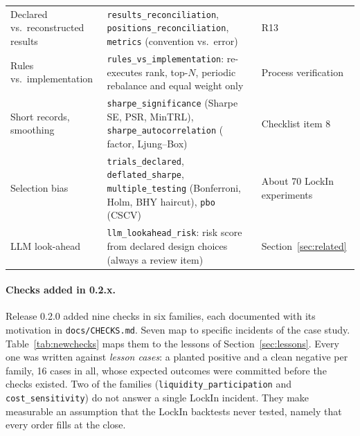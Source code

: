 \documentclass[11pt]{article}
\begin{document}
\begin{table}[t]
\begin{tabularx}{\textwidth}{>{\raggedright\arraybackslash}p{3.3cm}>{\raggedright\arraybackslash}X>{\raggedright\arraybackslash}p{3.7cm}}
Declared vs.\ reconstructed results & \texttt{results\_reconciliation}, \texttt{positions\_reconciliation}, \texttt{metrics} (convention vs.\ error) & R13 \\
Rules vs.\ implementation & \texttt{rules\_vs\_implementation}: re-executes rank, top-$N$, periodic rebalance and equal weight only & Process verification \\
Short records, smoothing & \texttt{sharpe\_significance} (Sharpe SE, PSR, MinTRL), \texttt{sharpe\_autocorrelation} (\citealt{Lo2002} factor, Ljung--Box) & Checklist item 8 \\
Selection bias & \texttt{trials\_declared}, \texttt{deflated\_sharpe}, \texttt{multiple\_testing} (Bonferroni, Holm, BHY haircut), \texttt{pbo} (CSCV) & About 70 LockIn experiments \\
LLM look-ahead & \texttt{llm\_lookahead\_risk}: risk score from declared design choices (always a review item) & Section~\ref{sec:related} \\
\bottomrule
\end{tabularx}
\end{table}

\paragraph{Checks added in 0.2.x.} Release 0.2.0 added nine checks in six families, each documented with its motivation in \texttt{docs/CHECKS.md}. Seven map to specific incidents of the case study. Table~\ref{tab:newchecks} maps them to the lessons of Section~\ref{sec:lessons}. Every one was written against \emph{lesson cases}: a planted positive and a clean negative per family, 16 cases in all, whose expected outcomes were committed before the checks existed. Two of the families (\texttt{liquidity\_participation} and \texttt{cost\_sensitivity}) do not answer a single LockIn incident. They make measurable an assumption that the LockIn backtests never tested, namely that every order fills at the close.
\end{document}
